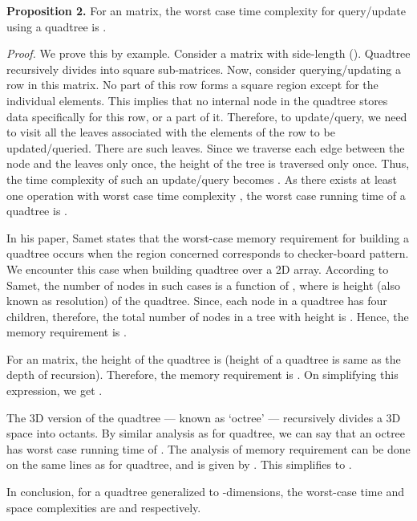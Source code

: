 \documentclass[a4paper]{article}
\begin{document}
\vspace{2 mm}
\noindent
\textbf{Proposition 2.} For an  matrix, the worst case time complexity for query/update using a quadtree is .

\vspace{1 mm}
\noindent
\textit{Proof.} We prove this by example. Consider a matrix  with side-length  (). Quadtree recursively divides  into square sub-matrices. Now, consider querying/updating a row in this matrix. No part of this row forms a square region except for the individual elements. This implies that no internal node in the quadtree stores data specifically for this row, or a part of it. Therefore, to update/query, we need to visit all the leaves associated with the elements of the row to be updated/queried. There are  such leaves. Since we traverse each edge between the node and the leaves only once, the height of the tree is traversed only once. Thus, the time complexity of such an update/query becomes . As there exists at least one operation with worst case time complexity , the worst case running time of a quadtree is .

\vspace{2 mm}
In his paper\cite[p. 240]{HS2}, Samet states that the worst-case memory requirement for building a quadtree occurs when the region concerned corresponds to checker-board pattern. We encounter this case when building quadtree over a 2D array. According to Samet, the number of nodes in such cases is a function of , where  is height (also known as resolution) of the quadtree. Since, each node in a quadtree has four children, therefore, the total number of nodes in a tree with height  is .\cite{QTN} Hence, the memory requirement is .

\vspace{2 mm}
For an  matrix, the height of the quadtree is  (height of a quadtree is same as the depth of recursion\cite[p. 2--3]{QTN}). Therefore, the memory requirement is . On simplifying this expression, we get .

The 3D version of the quadtree --- known as `octree' --- recursively divides a 3D space into octants. By similar analysis as for quadtree, we can say that an octree has worst case running time of . The analysis of memory requirement can be done on the same lines as for quadtree, and is given by . This simplifies to . 


\vspace{2 mm}
In conclusion, for a quadtree generalized to -dimensions, the worst-case time and space complexities are  and  respectively.
\end{document}
